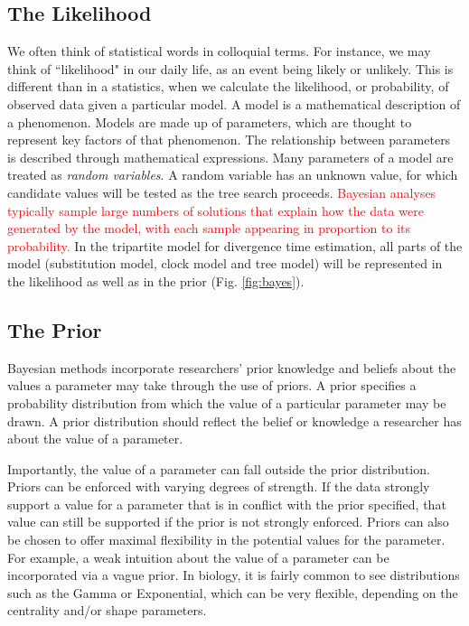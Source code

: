 \documentclass[11pt]{article}
\newcommand{\rw}[1]{{\textcolor{red}{[RW: #1]}}} %
\newcommand{\edit}[1]{{\textcolor{red}{#1}}} %
\begin{document}
\subsection{The Likelihood}

We often think of statistical words in colloquial terms.
For instance, we may think of ``likelihood" in our daily life, as an event being likely or unlikely. 
This is different than in a statistics, when we calculate the likelihood, or probability, of observed data given a particular model.
A model is a mathematical description of a phenomenon.
Models are made up of parameters, which are thought to represent key factors of that phenomenon.
The relationship between parameters is described through mathematical expressions.
Many parameters of a model are treated as \textit{random variables}.
A random variable has an unknown value, for which candidate values will be tested as the tree search proceeds. 
\edit{Bayesian analyses typically sample large numbers of solutions that explain how the data were generated by the model, with each sample appearing in proportion to its probability.}
In the tripartite model for divergence time estimation, all parts of the model (substitution model, clock model and tree model) will be represented in the likelihood as well as in the prior (Fig. \ref{fig:bayes}).


\subsection{The Prior}


Bayesian methods incorporate researchers' prior knowledge and beliefs about the values a parameter may take through the use of priors.
A prior specifies a probability distribution from which the value of a particular parameter may be drawn.
A prior distribution should reflect the belief or knowledge a researcher has about the value of a parameter.

Importantly, the value of a parameter can fall outside the prior distribution.
Priors can be enforced with varying degrees of strength.
If the data strongly support a value for a parameter that is in conflict with the prior specified, that value can still be supported if the prior is not strongly enforced.
Priors can also be chosen to offer maximal flexibility in the potential values for the parameter.
For example, a weak intuition about the value of a parameter can be incorporated via a vague prior.
In biology, it is fairly common to see distributions such as the Gamma or Exponential, which can be very flexible, depending on the centrality and/or shape parameters.
\end{document}

